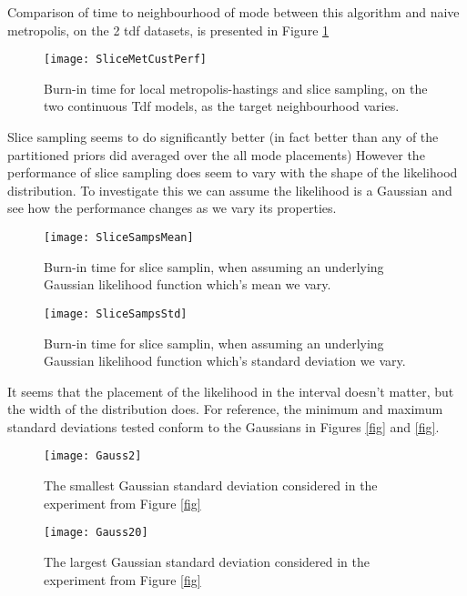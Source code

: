 Comparison of time to neighbourhood of mode between this algorithm and naive metropolis, on the 2 tdf datasets, is presented in Figure \ref{fig:SliceMetCustPerf}

\begin{figure}[H]
    \centering
    \texttt{[image: SliceMetCustPerf]}
    \caption{Burn-in time for local metropolis-hastings and slice sampling, on the two continuous Tdf models, as the target neighbourhood varies.}
    \label{fig:SliceMetCustPerf}
\end{figure}

Slice sampling seems to do significantly better (in fact better than any of the partitioned priors did averaged over the all mode placements)
However the performance of slice sampling does seem to vary with the shape of the likelihood distribution. To investigate this we can assume the likelihood is a Gaussian and see how the performance changes as we vary its properties.

\begin{figure}[H]
    \centering
    \texttt{[image: SliceSampsMean]}
    \caption{Burn-in time for slice samplin, when assuming an underlying Gaussian likelihood function which's mean we vary.}
    \label{fig:SliceSampsMean}
\end{figure}

\begin{figure}[H]
    \centering
    \texttt{[image: SliceSampsStd]}
    \caption{Burn-in time for slice samplin, when assuming an underlying Gaussian likelihood function which's standard deviation we vary.}
    \label{fig:SliceSampsStd}
\end{figure}

It seems that the placement of the likelihood in the interval doesn't matter, but the width of the distribution does. For reference, the minimum and maximum standard deviations tested conform to the Gaussians in Figures \ref{fig} and \ref{fig}.

\begin{figure}[H]
    \centering
    \texttt{[image: Gauss2]}
    \caption{The smallest Gaussian standard deviation considered in the experiment from Figure \ref{fig}}
    \label{fig:Gauss2}
\end{figure}

\begin{figure}[H]
    \centering
    \texttt{[image: Gauss20]}
    \caption{The largest Gaussian standard deviation considered in the experiment from Figure \ref{fig}}
    \label{fig:Gauss20}
\end{figure}

